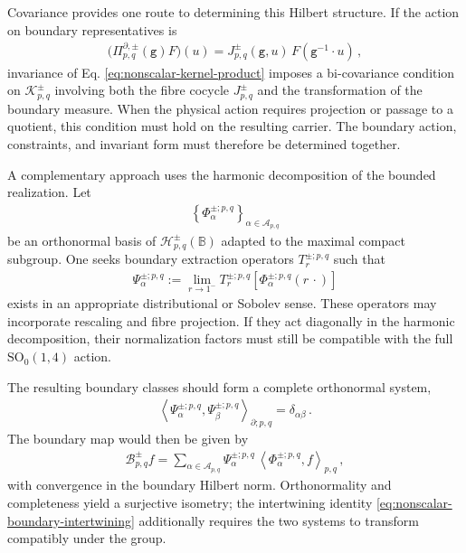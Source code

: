 \documentclass{SciPost}
\begin{document}
Covariance provides one route to determining this Hilbert structure. If the action on boundary representatives is
\begin{align}
    \bigl(
        \Pi_{p,q}^{\partial,\pm}(\texttt{g})F
    \bigr)(u)
    =
    J_{p,q}^{\pm}(\texttt{g},u)\,
    F(\texttt{g}^{-1}\cdot u) \,,
\end{align}
invariance of Eq. \eqref{eq:nonscalar-kernel-product} imposes a bi-covariance condition on ${\mathcal K}_{p,q}^{\pm}$ involving both the fibre cocycle $J_{p,q}^{\pm}$ and the transformation of the boundary measure. When the physical action requires projection or passage to a quotient, this condition must hold on the resulting carrier. The boundary action, constraints, and invariant form must therefore be determined together.

A complementary approach uses the harmonic decomposition of the bounded realization. Let
\begin{align}
    \left\{
        \Phi_{\alpha}^{\pm;p,q}
    \right\}_{\alpha\in{\mathcal A}_{p,q}}
\end{align}
be an orthonormal basis of ${\mathcal H}_{p,q}^{\pm}(\mathbb B)$ adapted to the maximal compact subgroup. One seeks boundary extraction operators $T_r^{\pm;p,q}$ such that
\begin{align}
    \Psi_{\alpha}^{\pm;p,q}
    :=
    \lim_{r\to1^-}
    T_r^{\pm;p,q}
    \left[
        \Phi_{\alpha}^{\pm;p,q}(r\,\cdot)
    \right]
\end{align}
exists in an appropriate distributional or Sobolev sense. These operators may incorporate rescaling and fibre projection. If they act diagonally in the harmonic decomposition, their normalization factors must still be compatible with the full $\mathrm{SO}_0(1,4)$ action.

The resulting boundary classes should form a complete orthonormal system,
\begin{align}
    \left\langle
        \Psi_{\alpha}^{\pm;p,q},
        \Psi_{\beta}^{\pm;p,q}
    \right\rangle_{\partial;p,q}
    =
    \delta_{\alpha\beta} \,.
\end{align}
The boundary map would then be given by
\begin{align}
    {\mathcal B}_{p,q}^{\pm}f
    =
    \sum_{\alpha\in{\mathcal A}_{p,q}}
    \Psi_{\alpha}^{\pm;p,q}\,
    \left\langle
        \Phi_{\alpha}^{\pm;p,q},f
    \right\rangle_{p,q} \,,
\end{align}
with convergence in the boundary Hilbert norm. Orthonormality and completeness yield a surjective isometry; the intertwining identity \eqref{eq:nonscalar-boundary-intertwining} additionally requires the two systems to transform compatibly under the group.
\end{document}
